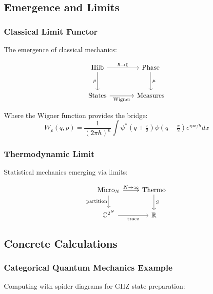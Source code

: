 \subsection{Emergence and Limits}

\subsubsection{Classical Limit Functor}

The emergence of classical mechanics:

\[
\begin{tikzcd}[row sep=large, column sep=large]
\text{Hilb} \arrow[r, "\hbar \to 0"] \arrow[d, "\rho"'] & 
\text{Phase} \arrow[d, "\mu"] \\
\text{States} \arrow[r, "\text{Wigner}"'] & 
\text{Measures}
\end{tikzcd}
\]

Where the Wigner function provides the bridge:
\[
W_\rho(q,p) = \frac{1}{(2\pi\hbar)^n} \int \psi^*(q+\tfrac{x}{2}) \psi(q-\tfrac{x}{2}) e^{ipx/\hbar} dx
\]

\subsubsection{Thermodynamic Limit}

Statistical mechanics emerging via limits:

\[
\begin{tikzcd}
\text{Micro}_N \arrow[r, "N \to \infty"] \arrow[d, "\text{partition}"'] & 
\text{Thermo} \arrow[d, "S"] \\
\mathbb{C}^{2^N} \arrow[r, "\text{trace}"'] & 
\mathbb{R}
\end{tikzcd}
\]

\subsection{Concrete Calculations}

\subsubsection{Categorical Quantum Mechanics Example}

Computing with spider diagrams for GHZ state preparation:


